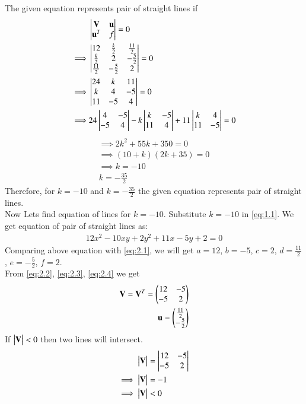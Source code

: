 \documentclass[journal,12pt,twocolumn]{IEEEtran}
\begin{document}
The given equation represents pair of straight lines if
\begin{align}
    &\begin{vmatrix}\mathbf{V} & \mathbf{u} \\ \mathbf{u}^T & f\end{vmatrix}=0\\
    \implies&\begin{vmatrix}12 & \frac{k}{2} & \frac{11}{2} \\ \frac{k}{2} & 2 & -\frac{5}{2} \\ \frac{11}{2} & -\frac{5}{2} & 2\end{vmatrix}=0\label{eq:2.6}\\
    \implies&\begin{vmatrix}24 & k & 11 \\ k & 4 & -5 \\ 11 & -5 & 4\end{vmatrix}=0\\
    \implies&24\begin{vmatrix} 4 & -5 \\ -5 & 4\end{vmatrix}-k\begin{vmatrix} k & -5 \\ 11 & 4\end{vmatrix}+11\begin{vmatrix} k & 4 \\ 11 & -5\end{vmatrix}=0
\end{align}
\begin{align}
    \implies2k^2+55k+350=0\\
    \implies(10+k)(2k+35)=0\\
    \implies k=-10\nonumber\\
    k=-\frac{35}{2}
\end{align}
Therefore, for $k=-10$ and $k=-\frac{35}{2}$ the given equation represents pair of straight lines.\\
Now Lets find equation of lines for $k=-10$.
\noindent
Substitute $k=-10$ in \eqref{eq:1.1}. We get equation of pair of straight lines as:
\begin{align}
    12x^2-10xy+2y^2+11x-5y+2=0
\end{align}
Comparing above equation with \eqref{eq:2.1}, we will get $a=12$, $b=-5$, $c=2$, $d=\frac{11}{2}$, $e=-\frac{5}{2}$, $f=2$.\\
From \eqref{eq:2.2}, \eqref{eq:2.3}, \eqref{eq:2.4} we get
\begin{align}
    \mathbf{V}=\mathbf{V}^T=\begin{pmatrix}12 & -5 \\ -5 & 2\end{pmatrix}\label{eq:2.17}\\
    \mathbf{u}=\begin{pmatrix}\frac{11}{2} \\ -\frac{5}{2}\end{pmatrix}\label{eq:2.18}
\end{align}
\noindent
If $\begin{vmatrix}\mathbf{V}\end{vmatrix}<0$ then two lines will intersect.
\begin{align}
    \begin{vmatrix}\mathbf{V}\end{vmatrix}&=\begin{vmatrix}12 & -5 \\ -5 & 2\end{vmatrix}\\
    \implies\begin{vmatrix}\mathbf{V}\end{vmatrix}&=-1\\
    \implies\begin{vmatrix}\mathbf{V}\end{vmatrix}&<0
\end{align}
\end{document}
